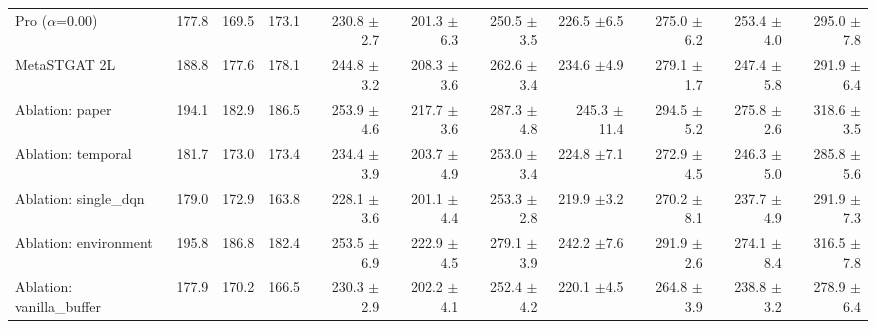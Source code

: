 \begin{table}
\begin{tabular}{@{}lrrrrrrrrrr@{}}
    Pro ($\alpha$=0.00)       & 177.8   & 169.5   & 173.1   & 230.8 {\fontsize{4}{4}\selectfont$\pm$2.7} & 201.3 {\fontsize{4}{4}\selectfont$\pm$6.3}  & 250.5 {\fontsize{4}{4}\selectfont$\pm$3.5} & 226.5 {\fontsize{4}{4}\selectfont$\pm$6.5}  & 275.0 {\fontsize{4}{4}\selectfont$\pm$6.2} & 253.4 {\fontsize{4}{4}\selectfont$\pm$4.0}  & 295.0 {\fontsize{4}{4}\selectfont$\pm$7.8}  \\
    MetaSTGAT 2L              & 188.8   & 177.6   & 178.1   & 244.8 {\fontsize{4}{4}\selectfont$\pm$3.2} & 208.3 {\fontsize{4}{4}\selectfont$\pm$3.6}  & 262.6 {\fontsize{4}{4}\selectfont$\pm$3.4} & 234.6 {\fontsize{4}{4}\selectfont$\pm$4.9}  & 279.1 {\fontsize{4}{4}\selectfont$\pm$1.7} & 247.4 {\fontsize{4}{4}\selectfont$\pm$5.8}  & 291.9 {\fontsize{4}{4}\selectfont$\pm$6.4}  \\
    Ablation: paper           & 194.1   & 182.9   & 186.5   & 253.9 {\fontsize{4}{4}\selectfont$\pm$4.6} & 217.7 {\fontsize{4}{4}\selectfont$\pm$3.6}  & 287.3 {\fontsize{4}{4}\selectfont$\pm$4.8} & 245.3 {\fontsize{4}{4}\selectfont$\pm$11.4} & 294.5 {\fontsize{4}{4}\selectfont$\pm$5.2} & 275.8 {\fontsize{4}{4}\selectfont$\pm$2.6}  & 318.6 {\fontsize{4}{4}\selectfont$\pm$3.5}  \\
    Ablation: temporal        & 181.7   & 173.0   & 173.4   & 234.4 {\fontsize{4}{4}\selectfont$\pm$3.9} & 203.7 {\fontsize{4}{4}\selectfont$\pm$4.9}  & 253.0 {\fontsize{4}{4}\selectfont$\pm$3.4} & 224.8 {\fontsize{4}{4}\selectfont$\pm$7.1}  & 272.9 {\fontsize{4}{4}\selectfont$\pm$4.5} & 246.3 {\fontsize{4}{4}\selectfont$\pm$5.0}  & 285.8 {\fontsize{4}{4}\selectfont$\pm$5.6}  \\
    Ablation: single\_dqn     & 179.0   & 172.9   & 163.8   & 228.1 {\fontsize{4}{4}\selectfont$\pm$3.6} & 201.1 {\fontsize{4}{4}\selectfont$\pm$4.4}  & 253.3 {\fontsize{4}{4}\selectfont$\pm$2.8} & 219.9 {\fontsize{4}{4}\selectfont$\pm$3.2}  & 270.2 {\fontsize{4}{4}\selectfont$\pm$8.1} & 237.7 {\fontsize{4}{4}\selectfont$\pm$4.9}  & 291.9 {\fontsize{4}{4}\selectfont$\pm$7.3}  \\
    Ablation: environment     & 195.8   & 186.8   & 182.4   & 253.5 {\fontsize{4}{4}\selectfont$\pm$6.9} & 222.9 {\fontsize{4}{4}\selectfont$\pm$4.5}  & 279.1 {\fontsize{4}{4}\selectfont$\pm$3.9} & 242.2 {\fontsize{4}{4}\selectfont$\pm$7.6}  & 291.9 {\fontsize{4}{4}\selectfont$\pm$2.6} & 274.1 {\fontsize{4}{4}\selectfont$\pm$8.4}  & 316.5 {\fontsize{4}{4}\selectfont$\pm$7.8}  \\
    Ablation: vanilla\_buffer & 177.9   & 170.2   & 166.5   & 230.3 {\fontsize{4}{4}\selectfont$\pm$2.9} & 202.2 {\fontsize{4}{4}\selectfont$\pm$4.1}  & 252.4 {\fontsize{4}{4}\selectfont$\pm$4.2} & 220.1 {\fontsize{4}{4}\selectfont$\pm$4.5}  & 264.8 {\fontsize{4}{4}\selectfont$\pm$3.9} & 238.8 {\fontsize{4}{4}\selectfont$\pm$3.2}  & 278.9 {\fontsize{4}{4}\selectfont$\pm$6.4}  \\

\end{tabular}
\end{table}
